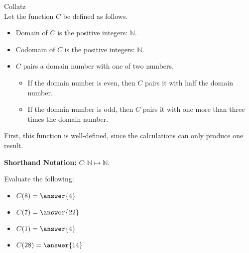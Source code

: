\documentclass{ximera}
\begin{document}
\begin{example} Collatz \\

Let the function $C$ be defined as follows.


\begin{itemize}
\item Domain of $C$ is the positive integers: $\mathbb{N}$.
\item Codomain of $C$ is the positive integers: $\mathbb{N}$.
\item $C$ pairs a domain number with one of two numbers.
	\begin{itemize}
			\item If the domain number is even, then $C$ pairs it with half the domain number.
			\item If the domain number is odd, then $C$ pairs it with one more than three times the domain number.
	\end{itemize}
\end{itemize}


First, this function is well-defined, since the calculations can only produce one result.


\textbf{Shorthand Notation: } $C: \mathbb{N} \mapsto \mathbb{N}$.

\begin{question}
Evaluate the following:

\begin{itemize}
	\item $C(8) = \answer{4}$
	\item $C(7) = \answer{22}$
	\item $C(1) = \answer{4}$
	\item $C(28) = \answer{14}$
\end{itemize}

\end{question}

\end{example}
\end{document}
